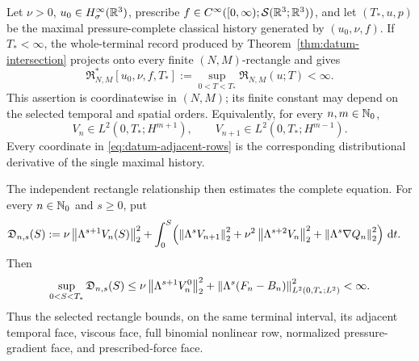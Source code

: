 \begin{theorem}
\label{thm:datum-rectangles}

Let \(\nu>0\), \(u_0\in H^\infty_\sigma(\mathbb R^3)\), prescribe
\(f\in C^\infty([0,\infty);\mathcal S(\mathbb R^3;\mathbb R^3))\), and let
\((T_*,u,p)\) be the maximal pressure-complete classical history generated
by \((u_0,\nu,f)\). If \(T_*<\infty\), the whole-terminal record produced by
Theorem~\ref{thm:datum-intersection} projects onto
every finite \((N,M)\)-rectangle and gives
\begin{equation}
 \mathfrak R_{N,M}^*[u_0,\nu,f,T_*]
 :=\sup_{0<T<T_*}\mathfrak R_{N,M}(u;T)
 <\infty.
 \label{eq:datum-rectangle-bound}
\end{equation}
This assertion is coordinatewise in \((N,M)\); its finite constant may depend
on the selected temporal and spatial orders.  Equivalently, for every
\(n,m\in\mathbb N_0\),
\begin{equation}
 V_n\in L^2(0,T_*;H^{m+1}),
 \qquad
 V_{n+1}\in L^2(0,T_*;H^{m-1}).
 \label{eq:datum-adjacent-rows}
\end{equation}
Every coordinate in \eqref{eq:datum-adjacent-rows} is the corresponding
distributional derivative of the single maximal history.

The independent rectangle relationship then estimates the complete equation.
For every \(n\in\mathbb N_0\) and \(s\ge0\), put
\begin{align}
 \mathfrak D_{n,s}(S):={}&
 \nu\left\lVert \Lambda^{s+1}V_n(S)\right\rVert_2^2
 +\int_0^S\!\left(
   \left\lVert \Lambda^sV_{n+1}\right\rVert_2^2
   +\nu^2\left\lVert \Lambda^{s+2}V_n\right\rVert_2^2
   +\left\lVert \Lambda^s\nabla Q_n\right\rVert_2^2\right)\,\mathrm d t.
 \label{eq:datum-complete-row-record}
\end{align}
Then
\begin{equation}
 \sup_{0<S<T_*}\mathfrak D_{n,s}(S)
 \le
 \nu\left\lVert \Lambda^{s+1}V_n^0\right\rVert_2^2
 +\left\lVert \Lambda^s(F_n-B_n)\right\rVert_{L^2(0,T_*;L^2)}^2
 <\infty.
 \label{eq:datum-complete-row-projection-bound}
\end{equation}
Thus the selected rectangle bounds, on the same terminal interval, its
adjacent temporal face, viscous face, full binomial nonlinear row, normalized
pressure-gradient face, and prescribed-force face.
\end{theorem}


